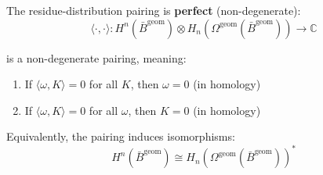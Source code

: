 \begin{theorem}\label{thm:perfect-pairing}
The residue-distribution pairing is \textbf{perfect} (non-degenerate):
$$\langle \cdot, \cdot \rangle: H^n(\bar{B}^{\text{geom}}) \otimes H_n(\Omega^{\text{geom}}(\bar{B}^{\text{geom}}))
\to \mathbb{C}$$

is a non-degenerate pairing, meaning:
\begin{enumerate}
\item If $\langle \omega, K \rangle = 0$ for all $K$, then $\omega = 0$ (in homology)
\item If $\langle \omega, K \rangle = 0$ for all $\omega$, then $K = 0$ (in homology)
\end{enumerate}

Equivalently, the pairing induces isomorphisms:
$$H^n(\bar{B}^{\text{geom}}) \cong H_n(\Omega^{\text{geom}}(\bar{B}^{\text{geom}}))^*$$
\end{theorem}

